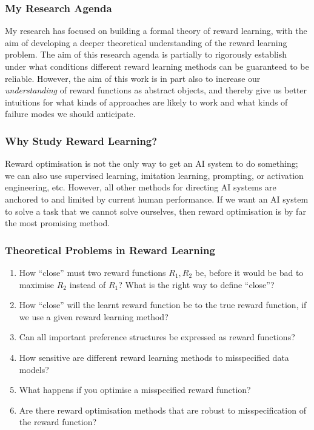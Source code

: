 \documentclass{beamer}
\begin{document}
\begin{frame}
    \frametitle{My Research Agenda}
    \small
    My research has focused on building a formal theory of reward learning, with the aim of developing a deeper theoretical understanding of the reward learning problem.
    \newline\newline
    The aim of this research agenda is partially to rigorously establish under what conditions different reward learning methods can be guaranteed to be reliable.
    \newline\newline
    However, the aim of this work is in part also to increase our \emph{understanding} of reward functions as abstract objects, and thereby give us better intuitions for what kinds of approaches are likely to work and what kinds of failure modes we should anticipate.
\end{frame}


\begin{frame}
    \frametitle{Why Study Reward Learning?}
    \small
    Reward optimisation is not the only way to get an AI system to do something; we can also use supervised learning, imitation learning, prompting, or activation engineering, etc.
    \newline\newline
    However, all other methods for directing AI systems are anchored to and limited by current human performance.
    \newline\newline
    If we want an AI system to solve a task that we cannot solve ourselves, then reward optimisation is by far the most promising method.
\end{frame}

\begin{frame}
    \frametitle{Theoretical Problems in Reward Learning}
    \small
    \begin{enumerate}
        \item How \enquote{close} must two reward functions $R_1, R_2$ be, before it would be bad to maximise $R_2$ instead of $R_1$? What is the right way to define \enquote{close}?
        \item How \enquote{close} will the learnt reward function be to the true reward function, if we use a given reward learning method?
        \item Can all important preference structures be expressed as reward functions?
        \item How sensitive are different reward learning methods to misspecified data models?
        \item What happens if you optimise a misspecified reward function?
        \item Are there reward optimisation methods that are robust to misspecification of the reward function?
    \end{enumerate}
\end{frame}
\end{document}

